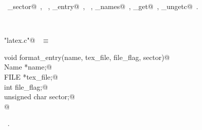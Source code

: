 \documentclass{report}
\begin{document}
\begin{flushleft}
\begin{minipage}{\linewidth}
\footnotesize\addtolength{\baselineskip}{-1ex}
\begin{list}{}{\setlength{\itemsep}{-\parsep}\setlength{\itemindent}{-\leftmargin}}
\item \NWtxtIdentsUsed\nobreak\  \verb@current_sector@\nobreak\ , \verb@FALSE@\nobreak\ , \verb@format_entry@\nobreak\ , \verb@fputs@\nobreak\ , \verb@macro_names@\nobreak\ , \verb@source_get@\nobreak\ , \verb@source_ungetc@\nobreak\ .\end{list}
\end{minipage}\\[4ex]
\end{flushleft}
\begin{flushleft} \small
\begin{minipage}{\linewidth} \label{scrap86}
\verb@"latex.c"@\nobreak\ {\footnotesize {} }$\equiv$
\vspace{-1ex}
\begin{list}{}{} \item
\mbox{}\verb@static void format_entry(name, tex_file, file_flag, sector)@\\
\mbox{}\verb@     Name *name;@\\
\mbox{}\verb@     FILE *tex_file;@\\
\mbox{}\verb@     int file_flag;@\\
\mbox{}\verb@     unsigned char sector;@\\
\mbox{}@\\
\mbox{}\verb@@{\NWsep}
\end{list}
\vspace{-1ex}
\footnotesize\addtolength{\baselineskip}{-1ex}
\begin{list}{}{\setlength{\itemsep}{-\parsep}\setlength{\itemindent}{-\leftmargin}}
\item \NWtxtFileDefBy\ .

\end{list}
\end{minipage}
\end{flushleft}
\end{document}
